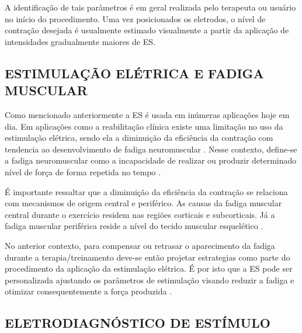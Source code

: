A identificação de tais parâmetros é em geral realizada pelo terapeuta ou usuário no início do procedimento. Uma vez posicionados os eletrodos, o nível de contração desejada é usualmente estimado visualmente a partir da aplicação de intensidades gradualmente maiores de \acrshort{ES}. 


\subsection{ESTIMULAÇÃO ELÉTRICA E FADIGA MUSCULAR}

Como mencionado anteriormente a \acrshort{ES} é usada em inúmeras aplicações hoje em dia. Em aplicações como a reabilitação clínica existe uma limitação no uso da estimulação elétrica, sendo ela a diminuição da eficiência da contração com tendencia ao desenvolvimento de fadiga neuromuscular \cite{DeOliveira2018NeuromuscularAdults}.
Nesse contexto, define-se a fadiga neuromuscular como a incapacidade de realizar ou produzir determinado nível de força de forma repetida no tempo \cite{Ascensao2003FisiologiaPeriferica}.

É importante ressaltar que a diminuição da eficiência da contração se relaciona com mecanismos de origem central e periférico. As causas da fadiga muscular central durante o exercício residem nas regiões corticais e subcorticais. Já a fadiga muscular periférica reside a nível do tecido muscular esquelético \cite{Ascensao2003FisiologiaPeriferica}. 

No anterior contexto, para compensar ou retrasar o aparecimento da fadiga durante a terapia/treinamento deve-se então projetar estrategias como parte do procedimento da aplicação da estimulação elétrica. É por isto que a \acrshort{ES} pode ser personalizada ajustando os parâmetros de estimulação visando reduzir a fadiga e otimizar consequentemente a força produzida \cite{LamA.DoucetB.2012NeuromuscularFunction.}.




\subsection{ELETRODIAGNÓSTICO DE ESTÍMULO}

